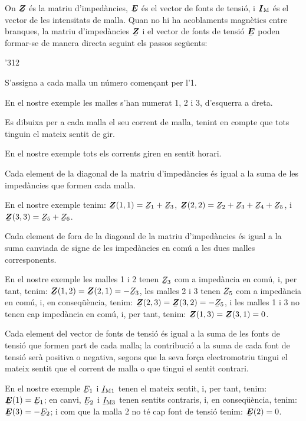 On  $\mcmplx{Z}$ és la matriu d'impedàncies, $\mcmplx{E}$ és el vector de fonts de tensió, i $\mcmplx{I}\ped{M}$ és el vector de les intensitats de malla. Quan no hi ha acoblaments magnètics entre branques, la matriu d'impedàncies $\mcmplx{Z}$ i el vector de fonts de tensió $\mcmplx{E}$ poden formar-se de manera directa seguint els passos següents:
\begin{dingautolist}{'312}
   \item S'assigna a cada malla un número començant per l'1.

          En el nostre exemple les malles s'han numerat 1, 2 i 3, d'esquerra a dreta.
   \item Es dibuixa per a  cada malla el seu corrent de malla, tenint en compte que tots tinguin el mateix sentit de gir.

       En el nostre exemple tots els corrents giren en sentit horari.
   \item Cada element de la diagonal de la matriu d'impedàncies és igual a la suma de les impedàncies que formen cada malla.

       En el nostre exemple tenim: $\mcmplx{Z}(1,1)=\cmplx{Z}_1 + \cmplx{Z}_3$, $\mcmplx{Z}(2,2)=\cmplx{Z}_2 + \cmplx{Z}_3+ \cmplx{Z}_4+ \cmplx{Z}_5$, i $\mcmplx{Z}(3,3)=\cmplx{Z}_5 + \cmplx{Z}_6$.
   \item Cada element de fora de la diagonal de la matriu d'impedàncies és igual a la suma canviada de signe de les impedàncies en comú a les dues malles corresponents.

        En el nostre exemple les malles 1 i 2 tenen $\cmplx{Z}_3$ com a impedància en comú, i, per tant, tenim: $\mcmplx{Z}(1,2)=\mcmplx{Z}(2,1)= -\cmplx{Z}_3$, les malles 2 i 3 tenen $\cmplx{Z}_5$ com a impedància en comú, i, en conseqüència,  tenim: $\mcmplx{Z}(2,3)=\mcmplx{Z}(3,2)= -\cmplx{Z}_5$, i les malles 1 i 3 no tenen cap impedància en comú, i, per tant,  tenim: $\mcmplx{Z}(1,3)=\mcmplx{Z}(3,1)= 0$.
    \item Cada element del vector de fonts de tensió és igual a la suma de les fonts de tensió que formen part de cada malla; la contribució a la suma de cada font de tensió serà positiva o negativa, segons que la seva força electromotriu tingui el mateix sentit que el corrent de malla o que  tingui el sentit contrari.

         En el nostre exemple $\cmplx{E}_1$ i $\cmplx{I}\ped{M1}$ tenen el mateix sentit, i, per tant, tenim:   $\mcmplx{E}(1) = \cmplx{E}_1$; en canvi, $\cmplx{E}_2$ i $\cmplx{I}\ped{M3}$ tenen   sentits contraris, i, en conseqüència,   tenim:   $\mcmplx{E}(3) = -\cmplx{E}_2$; i com que la malla 2 no té cap font de tensió  tenim:   $\mcmplx{E}(2) = 0$.
\end{dingautolist}


